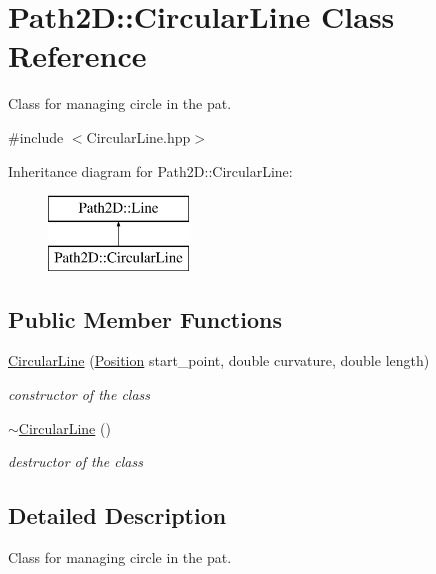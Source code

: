 \hypertarget{class_path2_d_1_1_circular_line}{}\section{Path2D\+:\+:Circular\+Line Class Reference}
\label{class_path2_d_1_1_circular_line}


Class for managing circle in the pat.  




{\ttfamily \#include $<$Circular\+Line.\+hpp$>$}

Inheritance diagram for Path2D\+:\+:Circular\+Line\+:\begin{figure}[H]
\begin{center}
\leavevmode
\includegraphics[height=2.000000cm]{class_path2_d_1_1_circular_line}
\end{center}
\end{figure}
\subsection*{Public Member Functions}
\begin{DoxyCompactItemize}
\item 
\mbox{\hyperlink{class_path2_d_1_1_circular_line_a8a7b86b18b725f74a9a66c19722c70f4}{Circular\+Line}} (\mbox{\hyperlink{class_path2_d_1_1_position}{Position}} start\+\_\+point, double curvature, double length)
\begin{DoxyCompactList}\small\item\em constructor of the class \end{DoxyCompactList}\item 
\mbox{\label{class_path2_d_1_1_circular_line_a70e9e93890420a1825d6c73ca966962d}} 
\mbox{\hyperlink{class_path2_d_1_1_circular_line_a70e9e93890420a1825d6c73ca966962d}{$\sim$\+Circular\+Line}} ()
\begin{DoxyCompactList}\small\item\em destructor of the class \end{DoxyCompactList}\end{DoxyCompactItemize}


\subsection{Detailed Description}
Class for managing circle in the pat. 

